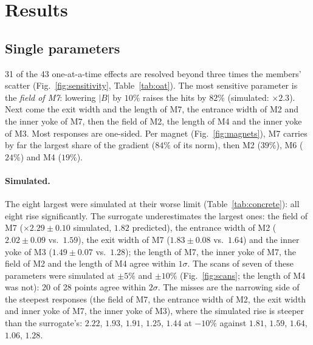 \documentclass[11pt,a4paper]{article}
\begin{document}
\section{Results}

\subsection{Single parameters}

31 of the 43 one-at-a-time effects are resolved beyond three times the members' scatter
(Fig.~\ref{fig:sensitivity}, Table~\ref{tab:oat}). The most sensitive parameter is the
\emph{field of M7}: lowering $|B|$ by $10\%$ raises the hits by $82\%$ (simulated: $\times2.3$).
Next come the exit width and the length of M7, the entrance width of M2 and the inner yoke of M7,
then the field of M2, the length of M4 and the inner yoke of M3. Most responses are one-sided.
Per magnet (Fig.~\ref{fig:magnets}), M7 carries by far the largest share of the gradient ($84\%$
of its norm), then M2 ($39\%$), M6 ($24\%$) and M4 ($19\%$).

\paragraph{Simulated.} The eight largest were simulated at their worse limit
(Table~\ref{tab:concrete}): all eight rise significantly. The surrogate underestimates the
largest ones: the field of M7 ($\times2.29\pm0.10$ simulated, $1.82$ predicted), the entrance
width of M2 ($2.02\pm0.09$ vs.\ $1.59$), the exit width of M7 ($1.83\pm0.08$ vs.\ $1.64$) and the
inner yoke of M3 ($1.49\pm0.07$ vs.\ $1.28$); the length of M7, the inner yoke of M7, the field of
M2 and the length of M4 agree within $1\sigma$. The scans of seven of these parameters were
simulated at $\pm5\%$ and $\pm10\%$ (Fig.~\ref{fig:scans}; the length of M4 was not): 20 of 28 points
agree within $2\sigma$. The misses are the narrowing side of the steepest responses (the field of
M7, the entrance width of M2, the exit width and inner yoke of M7, the inner yoke of M3), where the
simulated rise is steeper than the surrogate's: $2.22$, $1.93$, $1.91$, $1.25$, $1.44$ at $-10\%$
against $1.81$, $1.59$, $1.64$, $1.06$, $1.28$.
\end{document}
